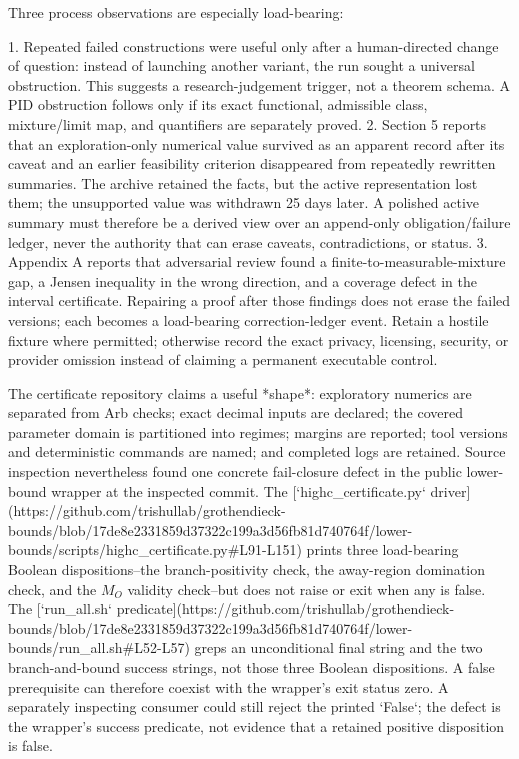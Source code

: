 \documentclass[11pt]{article}
\begin{document}
\begin{markdown}
Three process observations are especially load-bearing:

1. Repeated failed constructions were useful only after a human-directed change of question:
   instead of launching another variant, the run sought a universal obstruction. This suggests a
   research-judgement trigger, not a theorem schema. A PID obstruction follows only if its exact
   functional, admissible class, mixture/limit map, and quantifiers are separately proved.
2. Section 5 reports that an exploration-only numerical value survived as an apparent record after its caveat and an
   earlier feasibility criterion disappeared from repeatedly rewritten summaries. The archive
   retained the facts, but the active representation lost them; the unsupported value was withdrawn
   25 days later. A polished active summary must therefore be a derived view over an append-only
   obligation/failure ledger, never the authority that can erase caveats, contradictions, or status.
3. Appendix A reports that adversarial review found a finite-to-measurable-mixture gap, a Jensen inequality in
   the wrong direction, and a coverage defect in the interval certificate. Repairing a proof after
   those findings does not erase the failed versions; each becomes a load-bearing correction-ledger
   event. Retain a hostile fixture where permitted; otherwise record the exact privacy, licensing,
   security, or provider omission instead of claiming a permanent executable control.

The certificate repository claims a useful *shape*: exploratory numerics are separated from Arb
checks; exact decimal inputs are declared; the covered parameter domain is partitioned into
regimes; margins are reported; tool versions and deterministic commands are named; and completed
logs are retained. Source inspection nevertheless found one concrete fail-closure defect in the
public lower-bound wrapper at the inspected commit. The
[`highc_certificate.py` driver](https://github.com/trishullab/grothendieck-bounds/blob/17de8e2331859d37322c199a3d56fb81d740764f/lower-bounds/scripts/highc_certificate.py#L91-L151)
prints three load-bearing Boolean dispositions--the branch-positivity check, the away-region
domination check, and the $M_O$ validity check--but does not raise or exit when any is false. The
[`run_all.sh` predicate](https://github.com/trishullab/grothendieck-bounds/blob/17de8e2331859d37322c199a3d56fb81d740764f/lower-bounds/run_all.sh#L52-L57)
greps an unconditional final string and the two branch-and-bound success strings, not those three
Boolean dispositions. A false prerequisite can therefore coexist with the wrapper's exit status
zero. A separately inspecting consumer could still reject the printed `False`; the defect is the
wrapper's success predicate, not evidence that a retained positive disposition is false.


\end{markdown}
\end{document}
